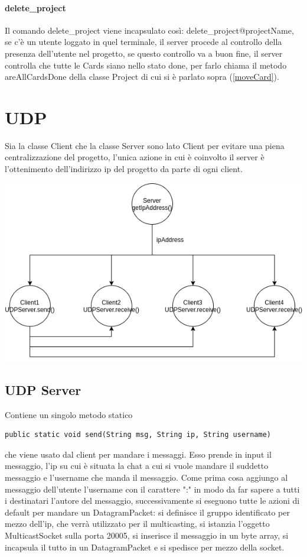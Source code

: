 \documentclass[]{article}
\begin{document}
\paragraph{delete\_project}
Il comando delete\_project viene incapsulato così:
delete\_project@projectName, se c'è un utente loggato in quel terminale, il server procede al controllo della presenza dell'utente nel progetto, se questo controllo va a buon fine, il server controlla che tutte le Cards siano nello stato done, per farlo chiama il metodo areAllCardsDone della classe Project di cui si è parlato sopra (\autoref{moveCard}).
\section{UDP}
Sia la classe Client che la classe Server sono lato Client per evitare una piena centralizzazione del progetto, l'unica azione in cui è coinvolto il server è l'ottenimento dell'indirizzo ip del progetto da parte di ogni client.
\begin{center}
	\includegraphics[scale=.6]{graphChat}
\end{center}
\subsection{UDP Server}
Contiene un singolo metodo statico
\begin{lstlisting}
public static void send(String msg, String ip, String username)
\end{lstlisting}
che viene usato dal client per mandare i messaggi.
Esso prende in input il messaggio, l'ip su cui è situata la chat a cui si vuole mandare il suddetto messaggio e l'username che manda il messaggio.
Come prima cosa aggiungo al messaggio dell'utente l'username con il carattere ":" in modo da far sapere a tutti i destinatari l'autore del messaggio, successivamente si eseguono tutte le azioni di default per mandare un DatagramPacket: si definisce il gruppo identificato per mezzo dell'ip, che verrà utilizzato per il multicasting, si istanzia l'oggetto MulticastSocket sulla porta 20005, si inserisce il messaggio in un byte array, si incapsula il tutto in un DatagramPacket e si spedisce per mezzo della socket.
\end{document}

